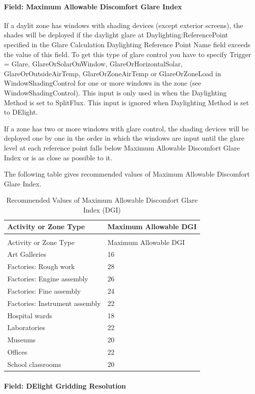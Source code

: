 \paragraph{Field: Maximum Allowable Discomfort Glare Index}\label{field-maximum-allowable-discomfort-glare-index}

If a daylit zone has windows with shading devices (except exterior screens), the shades will be deployed if the daylight glare at Daylighting:ReferencePoint specified in the Glare Calculation Daylighting Reference Point Name field exceeds the value of this field. To get this type of glare control you have to specify Trigger = Glare, GlareOrSolarOnWindow, GlareOrHorizontalSolar, GlareOrOutsideAirTemp, GlareOrZoneAirTemp or GlareOrZoneLoad in WindowShadingControl for one or more windows in the zone (see WindowShadingControl). This input is only used in when the Daylighting Method is set to SplitFlux. This input is ignored when Daylighting Method is set to DElight.

If a zone has two or more windows with glare control, the shading devices will be deployed one by one in the order in which the windows are input until the glare level at each reference point falls below Maximum Allowable Discomfort Glare Index or is as close as possible to it.

The following table gives recommended values of Maximum Allowable Discomfort Glare Index.

\begin{longtable}[c]{@{}ll@{}}
\caption{Recommended Values of Maximum Allowable Discomfort Glare Index (DGI) \label{table:recommended-values-discomfort-glare-index}} \tabularnewline
\toprule
Activity or Zone Type & Maximum Allowable DGI \tabularnewline
\midrule
\endfirsthead

\caption[]{Recommended Values of Maximum Allowable Discomfort Glare Index (DGI)} \tabularnewline
\toprule
Activity or Zone Type & Maximum Allowable DGI \tabularnewline
\midrule
\endhead

Art Galleries & 16 \tabularnewline
Factories: Rough work & 28 \tabularnewline
Factories: Engine assembly & 26 \tabularnewline
Factories: Fine assembly & 24 \tabularnewline
Factories: Instrument assembly & 22 \tabularnewline
Hospital wards & 18 \tabularnewline
Laboratories & 22 \tabularnewline
Museums & 20 \tabularnewline
Offices & 22 \tabularnewline
School classrooms & 20 \tabularnewline
\bottomrule
\end{longtable}

\paragraph{Field: DElight Gridding Resolution}\label{field-gridding-resolution}

